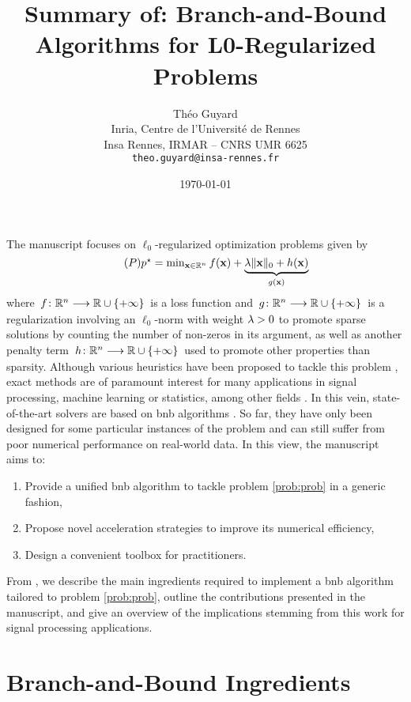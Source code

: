 \documentclass[11pt]{article}
\title{Summary of: Branch-and-Bound Algorithms for L0-Regularized Problems}
\author{Théo Guyard \\ Inria, Centre de l'Université de Rennes \\ Insa Rennes, IRMAR -- CNRS UMR 6625 \\ \texttt{theo.guyard@insa-rennes.fr}}
\date{\today}
\begin{document}
 

\maketitle

The manuscript focuses on $\ell_0$-regularized optimization problems given by
\begin{equation}
    \label{prob:prob}
    \tag{$\ppb$}
    \textstyle
    \opt{\pobj} = \min_{\pv \in \kR^{\pdim}} \lfunc(\pv) + \underbrace{\reg\norm{\pv}{0} + \pfunc(\pv)}_{\rfunc(\pv)}
\end{equation}
where $\kfuncdef{\lfunc}{\kR^{\pdim}}{\kR \cup \{+\infty\}}$ is a loss function and $\kfuncdef{\rfunc}{\kR^{\pdim}}{\kR \cup \{+\infty\}}$ is a regularization involving an $\ell_0$-norm with weight $\lambda > 0$ to promote sparse solutions by counting the number of non-zeros in its argument, as well as another penalty term $\kfuncdef{\pfunc}{\kR^{\pdim}}{\kR \cup \{+\infty\}}$ used to promote other properties than sparsity.
Although various heuristics have been proposed to tackle this problem \cite{tropp2010computational}, exact methods are of paramount interest for many applications in signal processing, machine learning or statistics, among other fields \citep{tillmann2021cardinality,bertsimas2016best}.
In this vein, state-of-the-art solvers are based on \gls{bnb} algorithms \citep{ben2022global,hazimeh2022sparse}.
So far, they have only been designed for some particular instances of the problem and can still suffer from poor numerical performance on real-world data.
In this view, the manuscript aims to:
\begin{enumerate}[nosep, label=\arabic*.]
    \item Provide a unified \gls{bnb} algorithm to tackle problem \eqref{prob:prob} in a generic fashion,
    \item Propose novel acceleration strategies to improve its numerical efficiency,
    \item Design a convenient toolbox for practitioners.
\end{enumerate} 
From , we describe the main ingredients required to implement a \gls{bnb} algorithm tailored to problem \eqref{prob:prob}, outline the contributions presented in the manuscript, and give an overview of the implications stemming from this work for signal processing applications.


\section{Branch-and-Bound Ingredients}
\label{sec:bnb}
\end{document}
